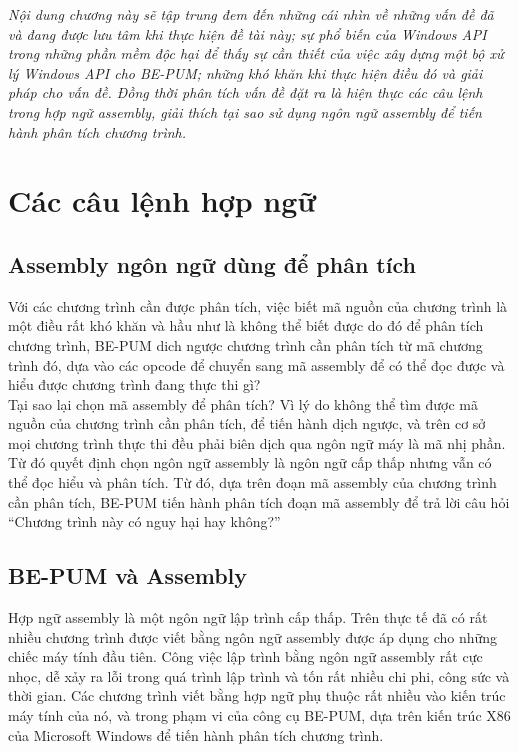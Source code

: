 \begin{concept}[15cm]
\textit{Nội dung chương này sẽ tập trung đem đến những cái nhìn về những vấn đề đã và đang được lưu tâm khi thực hiện đề tài này; sự phổ biến của Windows API trong những phần mềm độc hại để thấy sự cần thiết của việc xây dựng một bộ xử lý Windows API cho BE-PUM; những khó khăn khi thực hiện điều đó và giải pháp cho vấn đề. Đồng thời phân tích vấn đề đặt ra là hiện thực các câu lệnh trong hợp ngữ assembly, giải thích tại sao sử dụng ngôn ngữ assembly để tiến hành phân tích chương trình.}
\end{concept}

\section{Các câu lệnh hợp ngữ}

  \subsection{Assembly ngôn ngữ dùng để phân tích }

  Với các chương trình cần được phân tích, việc biết mã nguồn của chương trình là một điều rất khó khăn và hầu như là không thể biết được do đó để phân tích chương trình, BE-PUM dich ngược chương trình cần phân tích từ mã chương trình đó, dựa vào các opcode để chuyển sang mã assembly để có thể đọc được và hiểu được chương trình đang thực thi gì?\\

Tại sao lại chọn mã assembly để phân tích? Vì lý do không thể tìm được mã nguồn của chương trình cần phân tích, để tiến hành dịch ngược, và trên cơ sở mọi chương trình thực thi đều phải biên dịch qua ngôn ngữ máy là mã nhị phần. Từ đó quyết định chọn ngôn ngữ assembly là ngôn ngữ cấp thấp nhưng vẫn có thể đọc hiểu và phân tích. Từ đó, dựa trên đoạn mã assembly của chương trình cần phân tích, BE-PUM tiến hành phân tích đoạn mã assembly để trả lời câu hỏi “Chương trình này có nguy hại hay không?”

  \subsection{BE-PUM và Assembly}
  Hợp ngữ assembly là một ngôn ngữ lập trình cấp thấp. Trên thực tế đã có rất nhiều chương trình được viết bằng ngôn ngữ assembly được áp dụng cho những chiếc máy tính đầu tiên. Công việc lập trình bằng ngôn ngữ assembly rất cực nhọc, dễ xảy ra lỗi trong quá trình lập trình và tốn rất nhiều chi phi, công sức và thời gian. Các chương trình viết bằng hợp ngữ phụ thuộc rất nhiều vào kiến trúc máy tính của nó, và trong phạm vi của công cụ BE-PUM, dựa trên kiến trúc X86 của Microsoft Windows để tiến hành phân tích chương trình.\\

